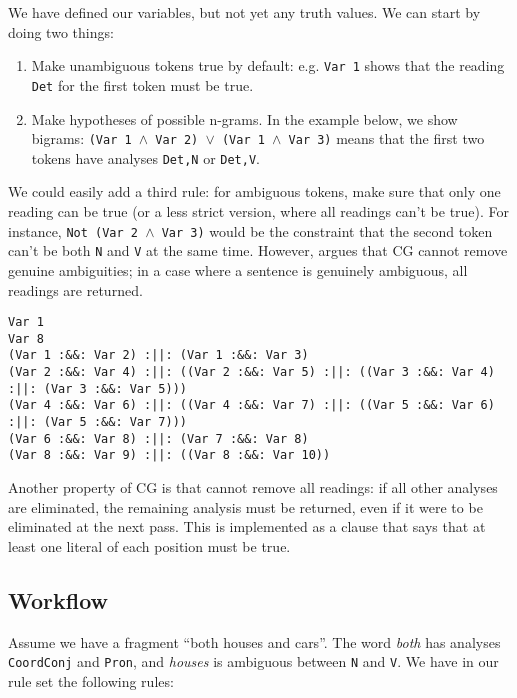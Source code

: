 \documentclass[a4paper, 11pt]{article}
\begin{document}
We have defined our variables, but not yet any truth values. We can
start by doing two things:
\begin{enumerate}
\item Make unambiguous tokens true by default: e.g. \texttt{Var 1}
  shows that the reading \texttt{Det} for the first token must be true.
\item Make hypotheses of possible n-grams. In the example below, we
show bigrams: \texttt{(Var 1 $\wedge$ Var 2) $\vee$ (Var 1 $\wedge$ Var 3)}
means that the first two tokens have analyses \texttt{Det,N} or
\texttt{Det,V}.
\end{enumerate}

We could easily add a third rule: for ambiguous tokens, make sure that
only one reading can be true (or a less strict version, where all
readings can't be true). For instance, \texttt{Not (Var 2 $\wedge$ Var
  3)} would be the constraint that the second token can't be both
\texttt{N} and \texttt{V} at the same time. However,
\cite{KarlssonTODO} argues that CG cannot remove genuine ambiguities;
in a case where a sentence is genuinely ambiguous, all readings are
returned.



\begin{lstlisting}
Var 1
Var 8
(Var 1 :&&: Var 2) :||: (Var 1 :&&: Var 3)
(Var 2 :&&: Var 4) :||: ((Var 2 :&&: Var 5) :||: ((Var 3 :&&: Var 4) :||: (Var 3 :&&: Var 5)))
(Var 4 :&&: Var 6) :||: ((Var 4 :&&: Var 7) :||: ((Var 5 :&&: Var 6) :||: (Var 5 :&&: Var 7)))
(Var 6 :&&: Var 8) :||: (Var 7 :&&: Var 8)
(Var 8 :&&: Var 9) :||: ((Var 8 :&&: Var 10))
\end{lstlisting}

Another property of CG is that cannot remove all readings: if all
other analyses are eliminated, the remaining analysis must be
returned, even if it were to be eliminated at the next pass. 
This is implemented as a clause that says that at least one literal
of each position must be true.

\subsection{Workflow}

Assume we have a fragment ``both houses and cars''.
The word \emph{both} has analyses \texttt{CoordConj} and
\texttt{Pron}, and \emph{houses} is ambiguous between \texttt{N} and \texttt{V}.
We have in our rule set the following rules:
\end{document}
